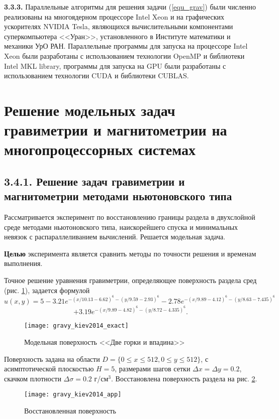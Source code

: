 {\bfseries 3.3.3.} Параллельные алгоритмы для решения задачи  (\ref{equ_grav}) были численно реализованы на многоядерном процессоре Intel Xeon и на графических ускорителях NVIDIA Tesla, являющихся вычислительными компонентами суперкомпьютера <<Уран>>, установленного в Институте математики и механики УрО РАН. Параллельные программы для запуска на процессоре Intel Xeon были разработаны с использованием технологии OpenMP и библиотеки Intel MKL library, программы для запуска на GPU были разработаны с использованием технологии CUDA и библиотеки CUBLAS. 

\newpage
\section{Решение модельных задач гравиметрии и магнитометрии на многопроцессорных системах}

\subsection*{3.4.1. Решение задач гравиметрии и магнитометрии методами ньютоновского типа} 

Рассматривается эксперимент по восстановлению границы раздела в двухслойной среде методами ньютоновского типа, наискорейшего спуска и минимальных невязок с распараллеливанием вычислений. Решается модельная задача. 

{\bfseries Целью} эксперимента является сравнить методы по точности решения и временам выполнения. 

Точное решение уравнения гравиметрии, определяющее поверхность раздела сред (рис. \ref{fig:gravy_kiev2014_exact}), задается формулой
$$\hat{u}(x,y)=5-3.21e^{-(x/10.13-6.62)^6-(y/9.59-2.93)^6}-2.78e^{-(x/9.89-4.12)^6-(y/8.63-7.435)^6}$$ 
\begin{equation}\label{exact_exp3.4.1}
+3.19e^{-(x/9.89-4.82)^6-(y/8.72-4.335)^6}.
\end{equation}
\begin{figure}[h]
	\centering
	\texttt{[image: gravy\_kiev2014\_exact]}
	\caption{Модельная поверхность <<Две горки и впадина>>}
	\label{fig:gravy_kiev2014_exact}
\end{figure}
Поверхность задана на области $D=\{0\le x\le 512, 0\le y\le 512\}$, с асимптотической плоскостью $H=5$, размерами шагов сетки $\Delta x=\Delta y=0.2$, скачком плотности $\Delta\sigma=0.2$ г/см$^3$. Восстановлена поверхность раздела на рис. \ref{fig:gravy_kiev2014_app}.
\begin{figure}[h]
	\centering
	\texttt{[image: gravy\_kiev2014\_app]}
	\caption{Восстановленная поверхность}
	\label{fig:gravy_kiev2014_app}
\end{figure}

